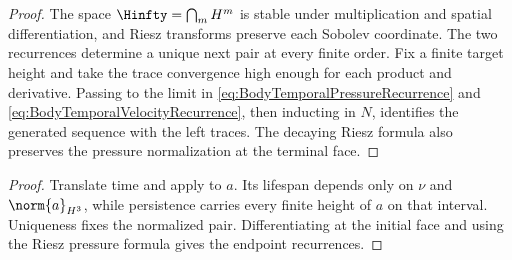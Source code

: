 \begin{proof}
The space \(\Hinfty=\bigcap_mH^m\) is stable under multiplication and spatial
differentiation, and Riesz transforms preserve each Sobolev coordinate.  The
two recurrences determine a unique next pair at every finite order.  Fix a
finite target height and take the trace convergence high enough for each
product and derivative.  Passing to the limit in
\eqref{eq:BodyTemporalPressureRecurrence} and
\eqref{eq:BodyTemporalVelocityRecurrence}, then inducting in \(N\), identifies
the generated sequence with the left traces.  The decaying Riesz formula also
preserves the pressure normalization at the terminal face.
\end{proof}


\begin{proof}
Translate time and apply  to \(a\).  Its
lifespan depends only on \(\nu\) and \(\norm{a}_{H^3}\), while persistence
carries every finite height of \(a\) on that interval.  Uniqueness fixes the
normalized pair.  Differentiating at the initial face and using the Riesz
pressure formula gives the endpoint recurrences.
\end{proof}
